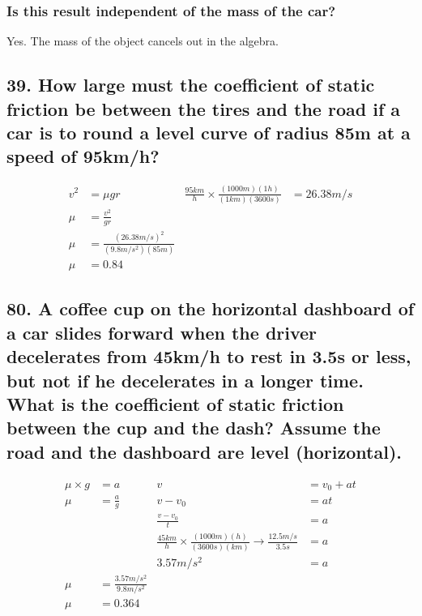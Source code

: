 \documentclass[12pt,a4paper,english]{article}
\begin{document}
\begin{flushleft}
  \subsubsection{Is this result independent of the mass of the car?}
  Yes. The mass of the object cancels out in the algebra.
  \subsection{39. How large must the coefficient of static friction be between the tires and the road if a car is to round a level curve of radius 85m at a speed of 95km/h?}
  \begin{align*}
    v^2&=\mu gr & 
    \frac{95km}{h}\times\frac{(1000m)(1h)}{(1km)(3600s)}&=26.38m/s
    \\
    \mu&=\frac{v^2}{gr}
    \\
    \mu&=\frac{(26.38m/s)^2}{(9.8m/s^2)(85m)}
    \\
    \mu&=0.84
  \end{align*}
  \subsection{80. A coffee cup on the horizontal dashboard of a car slides forward when the driver decelerates from 45km/h to rest in 3.5s or less, but not if he decelerates in a longer time. What is the coefficient of static friction between the cup and the dash? Assume the road and the dashboard are level (horizontal).}
  \begin{align*}
    \mu\times g&=a
               &v&=v_0+at
               \\
              \mu&=\frac{a}{g}&v-v_0&=at
               \\
               &&\frac{v-v_0}{t}&=a 
               \\
               && \frac{45km}{h}\times\frac{(1000m)(h)}{(3600s)(km)}\rightarrow\frac{12.5m/s}{3.5s}&=a
               \\
               &&3.57m/s^2&=a
               \\
    \mu&=\frac{3.57m/s^2}{9.8m/s^2}
    \\
    \mu&=0.364
  \end{align*}

\end{flushleft}
\end{document}
